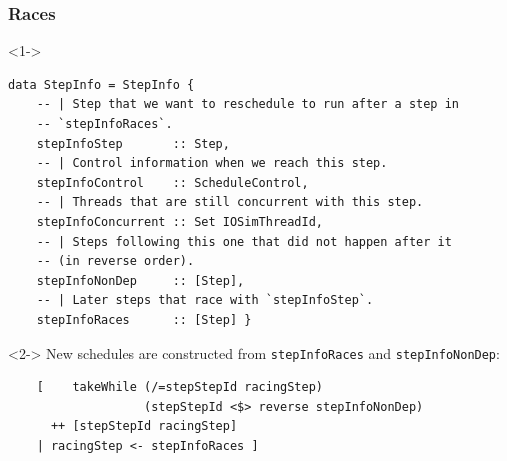 \documentclass[t,x11names,xcolor={x11names},hyperref={colorlinks,citecolor=Blue4,linkcolor=Blue4,anchorcolor=Blue4,urlcolor=Blue4}]{beamer}
\begin{document}
\begin{frame}[fragile]
  \frametitle{Races}
  \begin{onlyenv}<1->
  {\tiny
  \begin{verbatim}
data StepInfo = StepInfo {
    -- | Step that we want to reschedule to run after a step in
    -- `stepInfoRaces`.
    stepInfoStep       :: Step,
    -- | Control information when we reach this step.
    stepInfoControl    :: ScheduleControl,
    -- | Threads that are still concurrent with this step.
    stepInfoConcurrent :: Set IOSimThreadId,
    -- | Steps following this one that did not happen after it
    -- (in reverse order).
    stepInfoNonDep     :: [Step],
    -- | Later steps that race with `stepInfoStep`.
    stepInfoRaces      :: [Step] }
  \end{verbatim}
  }
  \end{onlyenv}
  \vspace{1em}
  \begin{onlyenv}<2->
  {\small New schedules are constructed from \texttt{stepInfoRaces} and \texttt{stepInfoNonDep}:}
    \vspace{0.5em}
  {\tiny\begin{verbatim}
    [    takeWhile (/=stepStepId racingStep)
                   (stepStepId <$> reverse stepInfoNonDep)
      ++ [stepStepId racingStep]
    | racingStep <- stepInfoRaces ]
  \end{verbatim}
  }
  \end{onlyenv}
\end{frame}
\end{document}
